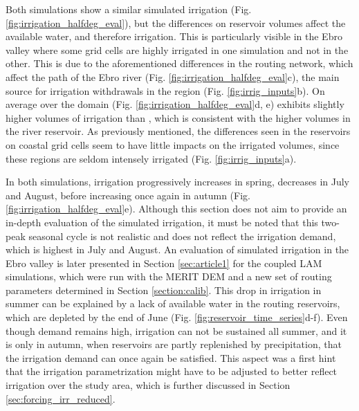 Both simulations show a similar simulated irrigation (Fig. \ref{fig:irrigation_halfdeg_eval}), but the differences on reservoir volumes affect the available water, and therefore irrigation. This is particularly visible in the Ebro valley where some grid cells are highly irrigated in one simulation and not in the other. This is due to the aforementioned differences in the routing network, which affect the path of the Ebro river (Fig. \ref{fig:irrigation_halfdeg_eval}c), the main source for irrigation withdrawals in the region (Fig. \ref{fig:irrig_inputs}b).
On average over the domain (Fig. \ref{fig:irrigation_halfdeg_eval}d, e) \std exhibits slightly higher volumes of irrigation than \native, which is consistent with the higher volumes in the river reservoir. %
As previously mentioned, the differences seen in the reservoirs on coastal grid cells seem to have little impacts on the irrigated volumes, since these regions are seldom intensely irrigated (Fig. \ref{fig:irrig_inputs}a). 

In both simulations, irrigation progressively increases in spring, decreases in July and August, before increasing once again in autumn (Fig. \ref{fig:irrigation_halfdeg_eval}e). Although this section does not aim to provide an in-depth evaluation of the simulated irrigation, it must be noted that this two-peak seasonal cycle is not realistic and does not reflect the irrigation demand, which is highest in July and August. 
An evaluation of simulated irrigation in the Ebro valley is later presented in Section \ref{sec:article1} for the coupled LAM simulations, which were run with the MERIT DEM and a new set of routing parameters determined in Section \ref{section:calib}.
This drop in irrigation in summer can be explained by a lack of available water in the routing reservoirs, which are depleted by the end of June (Fig. \ref{fig:reservoir_time_series}d-f). Even though demand remains high, irrigation can not be sustained all summer, and it is only in autumn, when reservoirs are partly replenished by precipitation, that the irrigation demand can once again be satisfied. This aspect was a first hint that the irrigation parametrization might have to be adjusted to better reflect irrigation over the study area, which is further discussed in Section \ref{sec:forcing_irr_reduced}.

